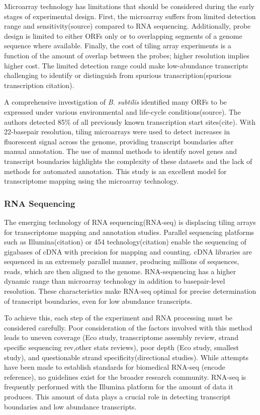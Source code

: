 Microarray technology has limitations that should be considered during the early stages of experimental design. First, the microarray suffers from limited detection range and sensitivity(source) compared to RNA sequencing. Additionally, probe design is limited to either ORFs only or to overlapping segments of a genome sequence where available. Finally, the cost of tiling array experiments is a function of the amount of overlap between the probes; higher resolution implies higher cost. The limited detection range could make low-abundance transcripts challenging to identify or distinguish from spurious transcription(spurious transcription citation).

A comprehensive investigation of \textit{B. subtilis} identified many ORFs to be expressed under various environmental and life-cycle conditions(source). The authors detected 85\% of all previously known transcription start sites(cite). With 22-basepair resolution, tiling microarrays were used to detect increases in fluorescent signal across the genome, providing transcript boundaries after manual annotation. The use of manual methods to identify novel genes and transcript boundaries highlights the complexity of these datasets and the lack of methods for automated annotation. This study is an excellent model for transcriptome mapping using the microarray technology.

\subsubsection{RNA Sequencing}
The emerging technology of RNA sequencing(RNA-seq) is displacing tiling arrays for transcriptome mapping and annotation studies. Parallel sequencing platforms such as Illumina(citation) or 454 technology(citation) enable the sequencing of gigabases of cDNA with precision for mapping and counting. cDNA libraries are sequenced in an extremely parallel manner, producing millions of sequences, reads, which are then aligned to the genome. RNA-sequencing has a higher dynamic range than microarray technology in addition to basepair-level resolution. These characteristics make RNA-seq optimal for precise determination of transcript boundaries, even for low abundance transcripts.

To achieve this, each step of the experiment and RNA processing must be considered carefully. Poor consideration of the factors involved with this method leads to uneven coverage (Eco study, transcriptome assembly review, strand specific sequencing rev,other stats reviews), poor depth (Eco study, smallest study), and questionable strand specificity(directional studies). While attempts have been made to establish standards for biomedical RNA-seq (encode reference), no guidelines exist for the broader research community. RNA-seq is frequently performed with the Illumina platform for the amount of data it produces. This amount of data plays a crucial role in detecting transcript boundaries and low abundance transcripts.

